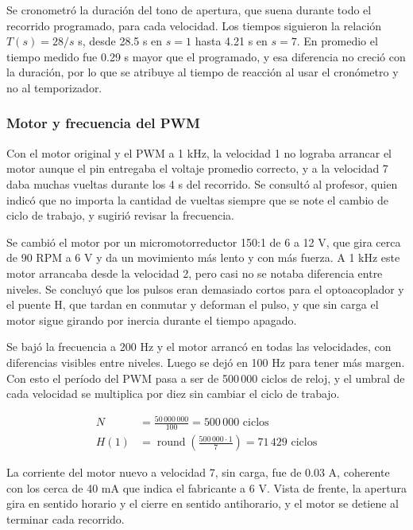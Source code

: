 \documentclass[11pt,letterpaper]{article}
\begin{document}
Se cronometró la duración del tono de apertura, que suena durante todo el recorrido programado, para cada velocidad. Los tiempos siguieron la relación $T(s) = 28/s$ s, desde 28.5 s en $s = 1$ hasta 4.21 s en $s = 7$. En promedio el tiempo medido fue 0.29 s mayor que el programado, y esa diferencia no creció con la duración, por lo que se atribuye al tiempo de reacción al usar el cronómetro y no al temporizador.

\subsubsection*{Motor y frecuencia del PWM}

Con el motor original y el PWM a 1 kHz, la velocidad 1 no lograba arrancar el motor aunque el pin entregaba el voltaje promedio correcto, y a la velocidad 7 daba muchas vueltas durante los 4 s del recorrido. Se consultó al profesor, quien indicó que no importa la cantidad de vueltas siempre que se note el cambio de ciclo de trabajo, y sugirió revisar la frecuencia.

Se cambió el motor por un micromotorreductor 150:1 de 6 a 12 V, que gira cerca de 90 RPM a 6 V y da un movimiento más lento y con más fuerza. A 1 kHz este motor arrancaba desde la velocidad 2, pero casi no se notaba diferencia entre niveles. Se concluyó que los pulsos eran demasiado cortos para el optoacoplador y el puente H, que tardan en conmutar y deforman el pulso, y que sin carga el motor sigue girando por inercia durante el tiempo apagado.

Se bajó la frecuencia a 200 Hz y el motor arrancó en todas las velocidades, con diferencias visibles entre niveles. Luego se dejó en 100 Hz para tener más margen. Con esto el período del PWM pasa a ser de 500\,000 ciclos de reloj, y el umbral de cada velocidad se multiplica por diez sin cambiar el ciclo de trabajo.

\begin{align*}
N &= \frac{50\,000\,000}{100} = 500\,000 \text{ ciclos} \\
H(1) &= \operatorname{round}\left(\frac{500\,000 \cdot 1}{7}\right) = 71\,429 \text{ ciclos}
\end{align*}

La corriente del motor nuevo a velocidad 7, sin carga, fue de 0.03 A, coherente con los cerca de 40 mA que indica el fabricante a 6 V. Vista de frente, la apertura gira en sentido horario y el cierre en sentido antihorario, y el motor se detiene al terminar cada recorrido.
\end{document}

